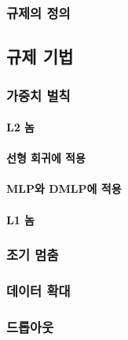 \documentclass [12pt] {oblivoir}
\let\oldsubsubsection=\subsubsection
\renewcommand{\subsubsection}
{
  \filbreak
  \oldsubsubsection
}
\begin{document}
\subsubsection{규제의 정의}

\subsection{규제 기법}

\subsubsection{가중치 벌칙}

\paragraph*{L2 놈}\mbox{}

\vspace{3mm}

\paragraph*{선형 회귀에 적용}\mbox{}

\vspace{3mm}

\paragraph*{MLP와 DMLP에 적용}\mbox{}

\vspace{3mm}

\paragraph*{L1 놈}\mbox{}

\vspace{3mm}

\subsubsection{조기 멈춤}

\subsubsection{데이터 확대}

\subsubsection{드롭아웃}
\end{document}

